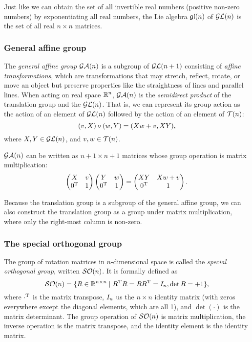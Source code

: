 \documentclass[../main.tex]{subfiles}
\begin{document}
\begin{refsection}
Just like we can obtain the set of all invertible real numbers (positive non-zero numbers) by exponentiating all real numbers, the Lie algebra $\mathfrak{gl}(n)$ of $\mathcal{GL}(n)$ is the set of all real $n \times n$ matrices.

\subsubsection{General affine group}\label{general-affine-group}

The \emph{general affine group} $\mathcal{GA}(n)$ is a subgroup of $\mathcal{GL}(n+1)$ consisting of \emph{affine transformations}, which are transformations that may stretch, reflect, rotate, or move an object but preserve properties like the straightness of lines and parallel lines.
When acting on real space $\mathbb{R}^n$, $\mathcal{GA}(n)$ is the \emph{semidirect product} of the translation group and the $\mathcal{GL}(n)$.
That is, we can represent its group action as the action of an element of $\mathcal{GL}(n)$ followed by the action of an element of $\mathcal{T}(n)$:
\[(\vec{v}, \mat{X}) \circ (\vec{w}, \mat{Y}) = (\mat{X} \vec{w} + \vec{v}, \mat{X} \mat{Y}),\]
where $\mat{X},\mat{Y} \in \GL{n}$, and $\vec{v}, \vec{w} \in \Transg{n}$.

$\mathcal{GA}(n)$ can be written as $n + 1 \times n + 1$ matrices whose group operation is matrix multiplication:
\[
\begin{pmatrix}
\mat{X} & \vec{v}\\
\trans{\vec{0}} & 1
\end{pmatrix}
\begin{pmatrix}
\mat{Y} & \vec{w}\\
\trans{\vec{0}} & 1
\end{pmatrix} = 
\begin{pmatrix}
\mat{X} \mat{Y} & \mat{X} \vec{w} + \vec{v}\\
\trans{\vec{0}} & 1
\end{pmatrix}.
\]

Because the translation group is a subgroup of the general affine group, we can also construct the translation group as a group under matrix multiplication, where only the right-most column is non-zero.

\subsubsection{The special orthogonal group}\label{the-special-orthogonal-group}

The group of rotation matrices in $n$-dimensional space is called the \emph{special orthogonal group}, written $\mathcal{SO}(n)$.
It is formally defined as
\[\SO{n}=\{\mat{R} \in \bbR^{n \times n} \mid \trans{\mat{R}} \mat{R} = \mat{R} \trans{\mat{R}} = \mat{I}_n, \det\mat{R} = +1 \},\]
where ${\cdot}^\mathrm{T}$ is the matrix transpose, $\mat{I}_n$ us the $n \times n$ identity matrix (with zeros everywhere except the diagonal elements, which are all 1), and $\det(\cdot)$ is the matrix determinant.
The group operation of $\mathcal{SO}(n)$ is matrix multiplication, the inverse operation is the matrix transpose, and the identity element is the identity matrix.


\end{refsection}
\end{document}
